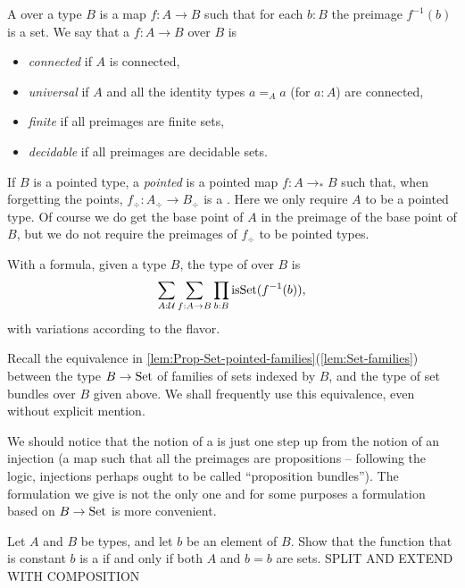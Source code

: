 \begin{definition}\label{def:covering}
A \emph{\covering} over a type $B$ 
is a map $f:A\to B$ such that for each $b:B$ the preimage $f^{-1}(b)$ is a set.
We say that a \covering $f:A\to B$ over $B$ is
\begin{itemize}
\item \emph{connected} if $A$ is connected, 
\item \emph{universal} if $A$ and all 
the identity types $a=_Aa$ (for $a:A$) are connected, 
\item \emph{finite} if all preimages are finite sets,
\item \emph{decidable} if all preimages are decidable sets.
\end{itemize}
If $B$ is a pointed type, a \emph{pointed} \covering is a pointed map $f:A\to_*B$ such that, when forgetting the points, $f_\div:A_\div\to B_\div$ is a \covering. Here we only
require $A$ to be a pointed type. Of course we do get the base point of $A$ in the 
preimage of the base point of $B$, but we do not require the preimages of $f_\div$
to be pointed types.
\end{definition}
With a formula, given a type $B$, the type of \coverings over $B$ is
\[
\sum_{A:\mathcal{U}}\sum_{f:A\to B}\prod_{b:B}\mathrm{isSet}(f^{-1}(b)),
\]
with variations according to the flavor.

Recall the equivalence in \cref{lem:Prop-Set-pointed-families}(\ref{lem:Set-families})
between the type $B\to\mathord{\mathrm{Set}}$ of families of sets indexed by $B$, and the type
of set bundles over $B$ given above.
We shall frequently use this equivalence, even without explicit mention.

We should notice that the notion of a \covering is just one step up from the notion of an
injection (a map such that all the preimages are propositions -- 
following the logic, injections perhaps ought to be called ``proposition bundles''). 
The formulation we give is not the only one and for some purposes a formulation
based on $B\to\mathord{\mathrm{Set}}$ is more convenient.

\begin{xca}\label{xca:constant-cover}
Let $A$ and $B$ be types, and let $b$ be an element of $B$.
Show that the function that is constant $b$ is a \covering
if and only if both $A$ and $b=b$ are sets. SPLIT AND EXTEND WITH COMPOSITION
\end{xca}

